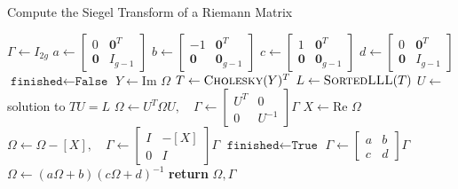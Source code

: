 \documentclass{amsart}
\begin{document}
\begin{algorithm}
\caption{Compute the Siegel Transform of a Riemann Matrix}
\label{alg: siegel}
\begin{algorithmic}

  \State $\Gamma \gets I_{2g}$
  \State $a \gets \left[ \begin{smallmatrix} 0 & \mathbf{0}^T \\ \mathbf{0} & I_{g-1} \end{smallmatrix} \right]$
  \State $b \gets \left[ \begin{smallmatrix} -1 & \mathbf{0}^T \\ \mathbf{0} & \mathbf{0}_{g-1} \end{smallmatrix} \right]$
  \State $c \gets \left[ \begin{smallmatrix} 1 & \mathbf{0}^T \\ \mathbf{0} & \mathbf{0}_{g-1} \end{smallmatrix} \right]$
  \State $d \gets \left[ \begin{smallmatrix} 0 & \mathbf{0}^T \\ \mathbf{0} & I_{g-1} \end{smallmatrix} \right]$
  \State $\texttt{finished} \gets \texttt{False}$
    \State $Y \gets \text{Im } \Omega$
    \State $T \gets \textsc{Cholesky}(Y)^T$
    \State $L \gets \textsc{SortedLLL}(T)$
    \State $U \gets$ solution to $TU = L$
    \State $\Omega \gets U^T \Omega U, \quad \Gamma \gets \left[ \begin{smallmatrix} U^T & 0 \\ 0 & U^{-1} \end{smallmatrix} \right] \Gamma$
    \State $X \gets \text{Re } \Omega$
    \State $\Omega \gets \Omega - [X], \quad \Gamma \gets \left[ \begin{smallmatrix} I & -[X] \\ 0 & I \end{smallmatrix} \right] \Gamma$
      \State $\texttt{finished} \gets \texttt{True}$
    \Else
      \State $\Gamma \gets \left[ \begin{smallmatrix} a & b \\ c & d \end{smallmatrix} \right] \Gamma$
      \State $\Omega \gets (a\Omega + b)(c \Omega + d)^{-1}$
    \EndIf
  \EndWhile
  \State \textbf{return} $\Omega, \Gamma$
\EndProcedure
\end{algorithmic}
\end{algorithm}
\end{document}
